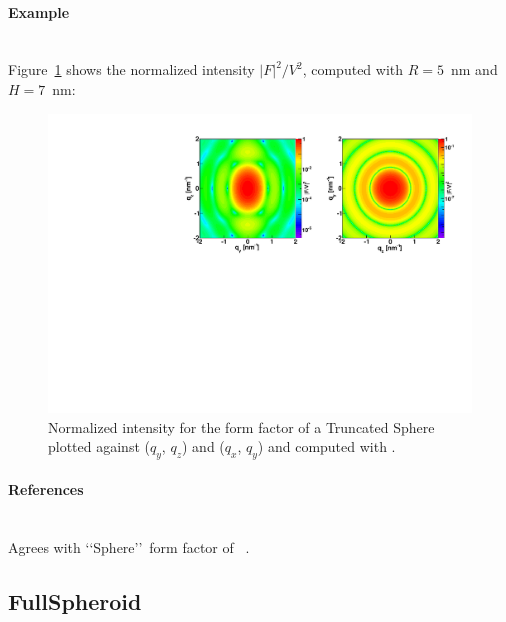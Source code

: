 \paragraph{Example}\strut\\
Figure~\ref{fig:SphereEx} shows the normalized intensity $|F|^2/V^2$, computed with $R=5$~nm and $H=7$~nm:
\begin{figure}[ht]
\begin{center}
\includegraphics[angle=-90,width=\textwidth]{fig/ff/figffsphere.pdf}
\end{center}
\caption{Normalized intensity for the form factor of a Truncated Sphere plotted against ($q_y$, $q_z$) and ($q_x$, $q_y$) and
  computed with .}
\label{fig:SphereEx}
\end{figure}

\paragraph{References}\strut\\
Agrees with \lq\lq Sphere\rq\rq\ form factor of \IsGISAXS~\cite{Laz02}.

\newpage
\subsection{FullSpheroid} 

